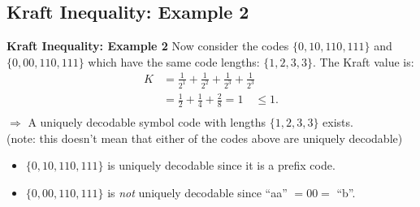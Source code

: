 \documentclass[compress]{beamer}        %
\makeatletter
\newcommand{\tcb}{\textcolor{beamer@blendedblue}}
\makeatother
\begin{document}
\subsection{Kraft Inequality: Example 2}
\begin{frame}{\bf \tcb{Kraft Inequality: Example 2}}
Now consider the codes $\{0,10,110,111\}$ and $\{0,00,110,111\}$ which have the same code lengths: $\{1,2,3,3\}$. The Kraft value is:\\
\begin{align*}
K &= \frac{1}{2^1}+\frac{1}{2^2}+\frac{1}{2^3}+\frac{1}{2^3} \\[0.5cm]
&= \frac{1}{2} + \frac{1}{4} + \frac{2}{8}= 1 \quad \le 1.\\[-0.2cm]
\end{align*}
$\Rightarrow$ A uniquely decodable symbol code with lengths $\{1,2,3,3\}$ exists.\\[0.0cm]
{\footnotesize(note: this doesn't mean that either of the codes above are uniquely decodable)}\\[0.3cm]

\begin{itemize}\itemsep0.4cm
\item $\{0,10,110,111\}$ is uniquely decodable since it is a prefix code.
\item $\{0,00,110,111\}$ is \emph{not} uniquely decodable since ``aa'' $=00=$ ``b''.
\end{itemize}


\end{frame}
\end{document}
